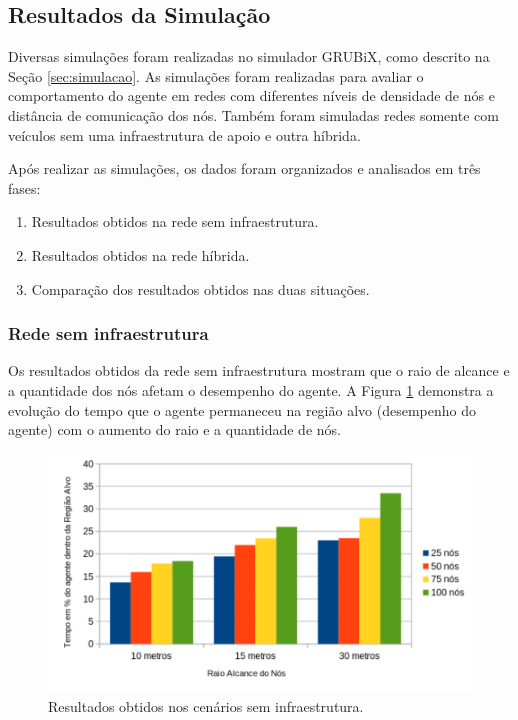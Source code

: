 \subsection{Resultados da Simulação}
\label{subsec:resultadoSimulacao}

	Diversas simulações foram realizadas no simulador GRUBiX, como descrito na Seção \ref{sec:simulacao}. As simulações foram realizadas para avaliar o comportamento do agente em redes com diferentes níveis de densidade de nós e distância de comunicação dos nós. Também foram simuladas redes somente com veículos sem uma infraestrutura de apoio e outra híbrida.

	Após realizar as simulações, os dados foram organizados e analisados em três fases:

	\begin{enumerate}
		\item Resultados obtidos na rede sem infraestrutura.
		\item Resultados obtidos na rede híbrida.
		\item Comparação dos resultados obtidos nas duas situações.
	\end{enumerate} 

	\subsubsection{Rede sem infraestrutura}
	\label{subsubsection:redeSemInfraestruturaResultadoDiscucao}

	Os resultados obtidos da rede sem infraestrutura mostram que o raio de alcance e a quantidade dos nós afetam o desempenho do agente. A Figura \ref{fig:graficosSemTorres} demonstra a evolução do tempo que o agente permaneceu na região alvo (desempenho do agente) com o aumento do raio e a quantidade de nós. 

	\begin{figure}[htbp]
		\centering
		\includegraphics[scale=0.5]{resultados/graficos/graficoSemTorres.pdf}
		\caption{Resultados obtidos nos cenários sem infraestrutura.}
		\label{fig:graficosSemTorres}
	\end{figure}

